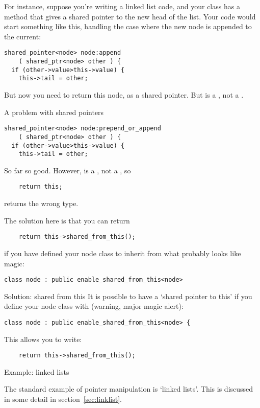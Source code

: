 For instance, suppose you're writing a linked list code, and your
 class has a method  that gives a shared
pointer to the new head of the list. Your code would start something
like this, handling the case where the new node is appended to the current:
\begin{verbatim}
shared_pointer<node> node:append
    ( shared_ptr<node> other ) {
  if (other->value>this->value) {
    this->tail = other;
\end{verbatim}
But now you need to return this node, as a shared pointer. But
 is a , not a .

\begin{slide}{A problem with shared pointers}
  \label{sl:share-ptr-node-sh}
\begin{verbatim}
shared_pointer<node> node:prepend_or_append
    ( shared_ptr<node> other ) {
  if (other->value>this->value) {
    this->tail = other;
\end{verbatim}
So far so good. However,  is a , not a
, so
\begin{verbatim}
    return this;
\end{verbatim}
returns the wrong type.
\end{slide}

The solution here is that you can return
\begin{verbatim}
    return this->shared_from_this();
\end{verbatim}
if you have defined your node class to inherit from what probably
looks like magic:
\begin{verbatim}
class node : public enable_shared_from_this<node>
\end{verbatim}

\begin{slide}{Solution: shared from this}
  \label{sl:share-ptr-node-from}
  It is possible to have a `shared pointer to this' if you
  define your node class with (warning, major magic alert):
\begin{verbatim}
class node : public enable_shared_from_this<node> {
\end{verbatim}
This allows you to write:
\begin{verbatim}
    return this->shared_from_this();
\end{verbatim}
\end{slide}

 {Example: linked lists}

The standard example of pointer manipulation is `linked lists'. This
is discussed in some detail in section~\ref{sec:linklist}.
